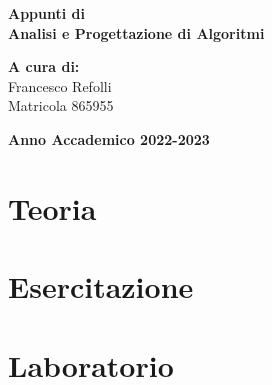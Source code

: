 \documentclass[a4paper,12pt,oneside]{book}
\begin{document}
    
    \begin{titlepage}
        
	\vspace{40mm}
        
	\begin{center}
            {\LARGE{
                    \textbf{Appunti di \\ Analisi e Progettazione di Algoritmi}
                    \par
            }}
        \end{center}
        
        \vspace{50mm}

        \begin{flushright}
            {\large \textbf{A cura di:}} \\
            \large{Francesco Refolli} \\
            \large{Matricola 865955} 
        \end{flushright}
        
        \vspace{40mm}
        \begin{center}
            {\large{\bf Anno Accademico 2022-2023}}
        \end{center}

        \restoregeometry
        
    \end{titlepage}
    
    \printindex
    
    
    \part{Teoria}
    
    
    
    
    
    \part{Esercitazione}
    
    
    
    \part{Laboratorio}
    
    
    
\end{document}
